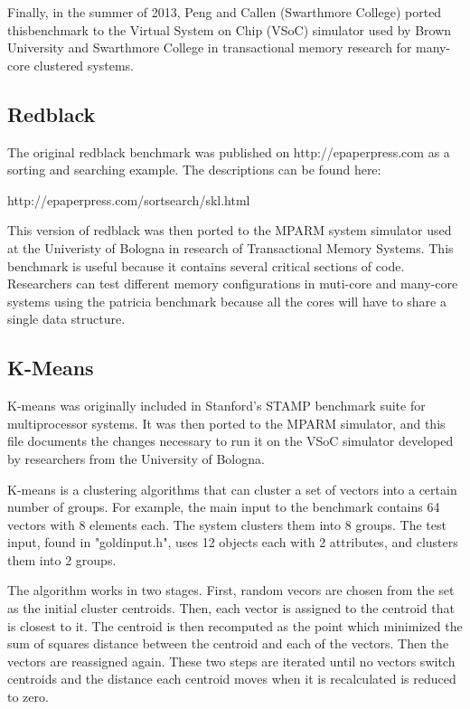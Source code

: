 \documentclass{article}
\begin{document}
Finally, in the summer of 2013, Peng and Callen (Swarthmore College) ported 
thisbenchmark to the Virtual System on Chip (VSoC) simulator used by Brown 
University and Swarthmore College in transactional memory research for 
many-core clustered systems. 

\subsection{Redblack}

The original redblack benchmark was published on http://epaperpress.com
as a sorting and searching example. The descriptions can be found here:

http://epaperpress.com/sortsearch/skl.html

This version of redblack was then ported to the MPARM system simulator used at 
the Univeristy of Bologna in research of Transactional Memory Systems. This
benchmark is useful because it contains several critical sections of code. 
Researchers can test different memory configurations in muti-core and many-core 
systems using the patricia benchmark because all the cores will have to share a 
single data structure. 


\subsection{K-Means}

K-means was originally included in Stanford's STAMP benchmark suite for 
multiprocessor systems.  It was then ported to the MPARM simulator, and this
file documents the changes necessary to run it on the VSoC simulator developed
by researchers from the University of Bologna. 

K-means is a clustering algorithms that can cluster a set of vectors into a 
certain number of groups.  For example, the main input to the benchmark
contains 64 vectors with 8 elements each. The system clusters them into 8
groups.  The test input, found in "goldinput.h", uses 12 objects each with 
2 attributes, and clusters them into 2 groups. 

The algorithm works in two stages. First, random vecors are chosen from the
set as the initial cluster centroids. Then, each vector is assigned to the 
centroid that is closest to it. The centroid is then recomputed as the point
which minimized the sum of squares distance between the centroid and each of 
the vectors. Then the vectors are reassigned again. These two steps are
iterated until no vectors switch centroids and the distance each centroid moves
when it is recalculated is reduced to zero. 
\end{document}
